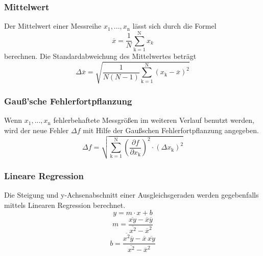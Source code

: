 \subsubsection{Mittelwert}
Der Mittelwert einer Messreihe $x_\text{1}, ... ,x_\text{n}$ lässt sich durch die Formel
\begin{equation}
	\overline{x} = \frac{1}{N} \sum_{\text{k}=1}^\text{N} x_k
	\label{eqn:ave}
\end{equation}
berechnen. Die Standardabweichung des Mittelwertes beträgt
\begin{equation}
	\Delta \overline{x} = \sqrt{ \frac{1}{N(N-1)} \sum_{\text{k}=1}^\text{N} (x_\text{k} - \overline{x})^2}
	\label{eqn:std}
\end{equation}

\subsubsection{Gauß'sche Fehlerfortpflanzung}
Wenn $x_\text{1}, ..., x_\text{n}$ fehlerbehaftete Messgrößen im weiteren Verlauf benutzt werden, wird der neue Fehler $\Delta f$ mit Hilfe der Gaußschen Fehlerfortpflanzung angegeben.
\begin{equation}
	\Delta f = \sqrt{\sum_{\text{k}=1}^\text{N} \left( \frac{ \partial f}{\partial x_\text{k}} \right) ^2 \cdot (\Delta x_\text{k})^2}
	\label{eqn:var}
\end{equation}

\subsubsection{Lineare Regression}
Die Steigung und y-Achsenabschnitt einer Ausgleichsgeraden werden gegebenfalls mittels Linearen Regression berechnet.
\begin{equation}
	y = m \cdot x + b
	\label{eqn:reg}
\end{equation}
\begin{equation}
	m = \frac{ \overline{xy} - \overline{x} \overline{y} } {\overline{x^2} - \overline{x}^2}
	\label{eqn:reg_m}
\end{equation}
\begin{equation}
	b = \frac{ \overline{x^2}\overline{y} - \overline{x} \, \overline{xy}} { \overline{x^2} - \overline{x}^2}
	\label{eqn:reg_b}
\end{equation}
